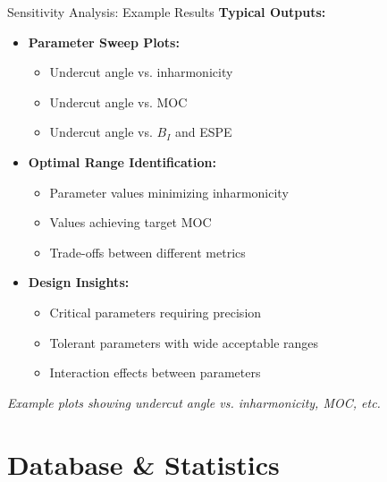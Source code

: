 \documentclass[aspectratio=169,10pt]{beamer}
\begin{document}
\begin{frame}{Sensitivity Analysis: Example Results}
\textbf{Typical Outputs:}

\begin{itemize}
    \item \textbf{Parameter Sweep Plots:}
    \begin{itemize}
        \item Undercut angle vs. inharmonicity
        \item Undercut angle vs. MOC
        \item Undercut angle vs. $B_I$ and ESPE
    \end{itemize}
    
    \item \textbf{Optimal Range Identification:}
    \begin{itemize}
        \item Parameter values minimizing inharmonicity
        \item Values achieving target MOC
        \item Trade-offs between different metrics
    \end{itemize}
    
    \item \textbf{Design Insights:}
    \begin{itemize}
        \item Critical parameters requiring precision
        \item Tolerant parameters with wide acceptable ranges
        \item Interaction effects between parameters
    \end{itemize}
\end{itemize}

\vspace{0.3cm}
\textit{Example plots showing undercut angle vs. inharmonicity, MOC, etc.}
\end{frame}

\section{Database \& Statistics}
\end{document}

